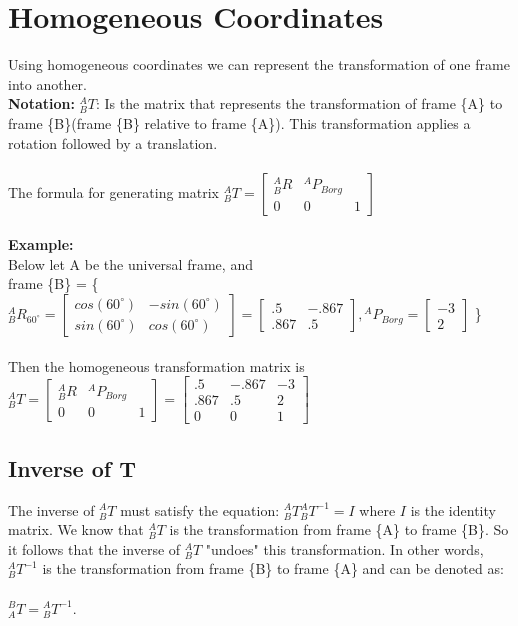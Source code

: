\documentclass{article}
\begin{document}
\section{Homogeneous Coordinates}
Using homogeneous coordinates we can represent the transformation of one frame into another.\\
\textbf{Notation: } ${}^A_BT$: Is the matrix that represents the transformation of frame \{A\} to frame \{B\}(frame \{B\} relative to frame \{A\}). This transformation applies a rotation followed by a translation. \\\\
The formula for generating matrix ${}^A_BT=\begin{bmatrix}
{}^A_B R & {}^A P_{Borg}\\
0 & 0 & 1
\end{bmatrix}$\\\\
\textbf{Example: }\\
Below let A be the universal frame, and\\ 
frame \{B\} = \{ ${}^{A}_{B}R_{60^\circ}=\begin{bmatrix}
cos(60^\circ) & -sin(60^\circ) \\
sin(60^\circ) & cos(60^\circ)
\end{bmatrix}=\begin{bmatrix}
.5 & -.867 \\
.867 & .5
\end{bmatrix}, 
{}^{A}P_{Borg}=\begin{bmatrix}
-3 \\
2
\end{bmatrix}$ \}\\\\
Then the homogeneous transformation matrix is ${}^A_B T = \begin{bmatrix}
{}^A_B R & {}^A P_{Borg}\\
0 & 0 & 1
\end{bmatrix}=\begin{bmatrix}
.5 & -.867 & -3 \\
.867 & .5 & 2 \\
0 & 0 & 1
\end{bmatrix}$

\subsection{Inverse of T}
The inverse of ${}^A_B T$ must satisfy the equation: ${}^A_B T {}^A_B T^{-1} = I$ where $I$ is the identity matrix. We know that ${}^A_B T$ is the transformation from frame \{A\} to frame \{B\}. So it follows that the inverse of ${}^A_B T$ "undoes" this transformation. In other words, ${}^A_B T^{-1}$ is the transformation from frame \{B\} to frame \{A\} and can be denoted as: \\\\${}^B_A T={}^A_B T^{-1}$. 
\newpage
\end{document}
